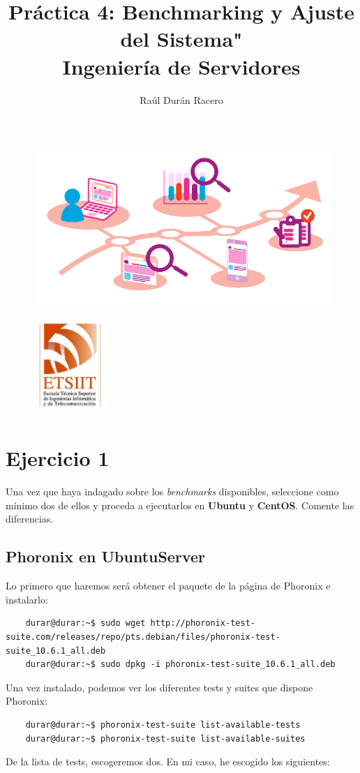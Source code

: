\documentclass[a4paper]{article}
\begin{document}
\pagestyle{plain}
\title{Práctica 4: Benchmarking y Ajuste del Sistema" \\ 
Ingeniería de Servidores}
\author{Raúl Durán Racero}
\begin{figure}
    \centering
    \includegraphics[width=\textwidth]{benchmarking004.png}
\end{figure}
\maketitle
\begin{figure}
    \centering
    \includegraphics[width=0.25\textwidth]{logoEtsiit.pdf}
\end{figure}

\newpage
\tableofcontents
\newpage
\section{Ejercicio 1}
Una vez que haya indagado sobre los \textsl{benchmarks} disponibles, seleccione 
como mínimo dos de ellos y proceda a ejecutarlos en \textbf{Ubuntu} y \textbf{CentOS}.
Comente las diferencias.
\subsection{Phoronix en UbuntuServer}
Lo primero que haremos será obtener el paquete de la página de Phoronix e instalarlo:
\begin{lstlisting}
    durar@durar:~$ sudo wget http://phoronix-test-suite.com/releases/repo/pts.debian/files/phoronix-test-suite_10.6.1_all.deb
    durar@durar:~$ sudo dpkg -i phoronix-test-suite_10.6.1_all.deb
\end{lstlisting}
Una vez instalado, podemos ver los diferentes tests y suites que dispone Phoronix:
\begin{lstlisting}
    durar@durar:~$ phoronix-test-suite list-available-tests
    durar@durar:~$ phoronix-test-suite list-available-suites
\end{lstlisting}
De la lista de tests, escogeremos dos. En mi caso, he escogido los siguientes:
\end{document}
